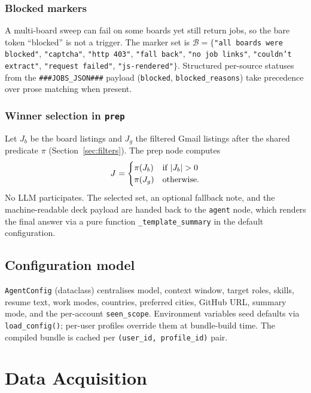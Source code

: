 \documentclass[11pt,a4paper]{article}
\newcommand{\code}[1]{\texttt{#1}}
\begin{document}
\subsubsection{Blocked markers}
A multi-board sweep can fail on some boards yet still return jobs, so the
bare token ``blocked'' is not a trigger. The marker set is
$\mathcal{B} = \{$\code{"all boards were blocked"}, \code{"captcha"},
\code{"http 403"}, \code{"fall back"}, \code{"no job links"},
\code{"couldn't extract"}, \code{"request failed"}, \code{"js-rendered"}$\}$.
Structured per-source statuses from the \code{###JOBS\_JSON###} payload
(\code{blocked}, \code{blocked\_reasons}) take precedence over prose
matching when present.

\subsubsection{Winner selection in \code{prep}}
Let $J_b$ be the board listings and $J_g$ the filtered Gmail listings after
the shared predicate $\pi$ (Section~\ref{sec:filters}). The prep node
computes
\begin{equation}
  J^{\*} =
  \begin{cases}
    \pi(J_b) & \text{if } |J_b| > 0 \\
    \pi(J_g) & \text{otherwise.}
  \end{cases}
\end{equation}
No LLM participates. The selected set, an optional fallback note, and the
machine-readable deck payload are handed back to the \code{agent} node, which
renders the final answer via a pure function \code{\_template\_summary} in
the default configuration.

\subsection{Configuration model}
\code{AgentConfig} (dataclass) centralises model, context window, target
roles, skills, resume text, work modes, countries, preferred cities,
GitHub URL, summary mode, and the per-account \code{seen\_scope}. Environment
variables seed defaults via \code{load\_config()}; per-user profiles override
them at bundle-build time. The compiled bundle is cached per
\texttt{(user\_id, profile\_id)} pair.

\section{Data Acquisition}
\label{sec:acquisition}
\end{document}
